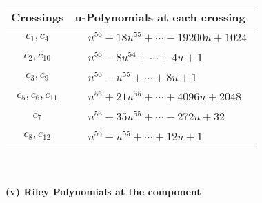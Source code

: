 \documentclass[1p]{elsarticle_modified}
\theoremstyle{definition}
\begin{document}
\begin{tabular}{m{50pt}|m{274pt}}
Crossings & \hspace{64pt}u-Polynomials at each crossing \\
\hline $$\begin{aligned}c_{1},c_{4}\end{aligned}$$&$\begin{aligned}
&u^{56}-18 u^{55}+\cdots-19200 u+1024
\end{aligned}$\\
\hline $$\begin{aligned}c_{2},c_{10}\end{aligned}$$&$\begin{aligned}
&u^{56}-8 u^{54}+\cdots+4 u+1
\end{aligned}$\\
\hline $$\begin{aligned}c_{3},c_{9}\end{aligned}$$&$\begin{aligned}
&u^{56}- u^{55}+\cdots+8 u+1
\end{aligned}$\\
\hline $$\begin{aligned}c_{5},c_{6},c_{11}\end{aligned}$$&$\begin{aligned}
&u^{56}+21 u^{55}+\cdots+4096 u+2048
\end{aligned}$\\
\hline $$\begin{aligned}c_{7}\end{aligned}$$&$\begin{aligned}
&u^{56}-35 u^{55}+\cdots-272 u+32
\end{aligned}$\\
\hline $$\begin{aligned}c_{8},c_{12}\end{aligned}$$&$\begin{aligned}
&u^{56}- u^{55}+\cdots+12 u+1
\end{aligned}$\\
\hline
\end{tabular}\\~\\
\newpage\renewcommand{\arraystretch}{1}
\flushleft \textbf{(v) Riley Polynomials at the component}\newline \\
\end{document}
